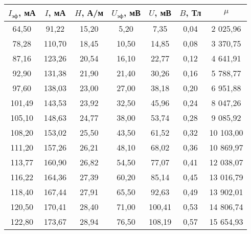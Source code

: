 \begin{table}[h!]
    \begin{center}
        \begin{tabular}{|c|c|c|c|c|c|c|}
            \hline
            $I_{\text{эф}}$, мА  & $I$, мА   & $H$, А/м  & $U_{\text{эф}}$, мВ  & $U$, мВ  & $B$, Тл & $\mu$      \\ \hline
            64,50                & 91,22     & 15,20     & 5,20                 & 7,35     & 0,04    & 2 025,96   \\ \hline
            78,28                & 110,70    & 18,45     & 10,50                & 14,85    & 0,08    & 3 370,75   \\ \hline
            87,16                & 123,26    & 20,54     & 16,10                & 22,77    & 0,12    & 4 641,91   \\ \hline
            92,90                & 131,38    & 21,90     & 21,40                & 30,26    & 0,16    & 5 788,77   \\ \hline
            97,60                & 138,03    & 23,00     & 27,00                & 38,18    & 0,20    & 6 951,88   \\ \hline
            101,49               & 143,53    & 23,92     & 32,50                & 45,96    & 0,24    & 8 047,26   \\ \hline
            105,10               & 148,63    & 24,77     & 38,00                & 53,74    & 0,28    & 9 085,92   \\ \hline
            108,20               & 153,02    & 25,50     & 43,50                & 61,52    & 0,32    & 10 103,00  \\ \hline
            111,20               & 157,26    & 26,21     & 48,10                & 68,02    & 0,36    & 10 869,97  \\ \hline
            113,77               & 160,90    & 26,82     & 54,50                & 77,07    & 0,41    & 12 038,07  \\ \hline
            116,22               & 164,36    & 27,39     & 60,20                & 85,14    & 0,45    & 13 016,79  \\ \hline
            118,40               & 167,44    & 27,91     & 65,50                & 92,63    & 0,49    & 13 902,01  \\ \hline
            120,50               & 170,41    & 28,40     & 71,00                & 100,41   & 0,53    & 14 806,74  \\ \hline
            122,80               & 173,67    & 28,94     & 76,50                & 108,19   & 0,57    & 15 654,93  \\ \hline

\end{tabular}
\end{center}
\end{table}
